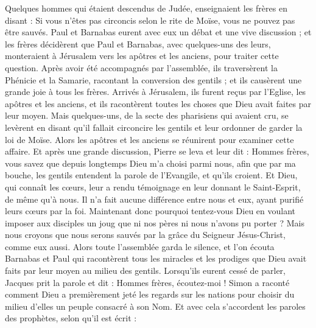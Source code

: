 \begin{multicols}{2}
\VerseOne{}Quelques hommes qui étaient descendus de Judée, enseignaient les frères en disant : Si vous n'êtes pas circoncis selon le rite de Moïse, vous ne pouvez pas être sauvés.
Paul et Barnabas eurent avec eux un débat et une vive discussion ; et les frères décidèrent que Paul et Barnabas, avec quelques-uns des leurs, monteraient à Jérusalem vers les apôtres et les anciens, pour traiter cette question.
Après avoir été accompagnés par l’assemblée, ils traversèrent la Phénicie et la Samarie, racontant la conversion des gentils ; et ils causèrent une grande joie à tous les frères.
Arrivés à Jérusalem, ils furent reçus par l'Eglise, les apôtres et les anciens, et ils racontèrent toutes les choses que Dieu avait faites par leur moyen.
Mais quelques-uns, de la secte des pharisiens qui avaient cru, se levèrent en disant qu'il fallait circoncire les gentils et leur ordonner de garder la loi de Moïse.
Alors les apôtres et les anciens se réunirent pour examiner cette affaire.
Et après une grande discussion, Pierre se leva et leur dit : Hommes frères, vous savez que depuis longtemps Dieu m’a choisi parmi nous, afin que par ma bouche, les gentils entendent la parole de l'Evangile, et qu'ils croient.
Et Dieu, qui connaît les cœurs, leur a rendu témoignage en leur donnant le Saint-Esprit, de même qu'à nous.
Il n'a fait aucune différence entre nous et eux, ayant purifié leurs cœurs par la foi.
Maintenant donc pourquoi tentez-vous Dieu en voulant imposer aux disciples un joug que ni nos pères ni nous n'avons pu porter ?
Mais nous croyons que nous serons sauvés par la grâce du Seigneur Jésus-Christ, comme eux aussi.
Alors toute l'assemblée garda le silence, et l’on écouta Barnabas et Paul qui racontèrent tous les miracles et les prodiges que Dieu avait faits par leur moyen au milieu des gentils.
Lorsqu’ils eurent cessé de parler, Jacques prit la parole et dit : Hommes frères, écoutez-moi !
Simon a raconté comment Dieu a premièrement jeté les regards sur les nations pour choisir du milieu d’elles un peuple consacré à son Nom. 
Et avec cela s'accordent les paroles des prophètes, selon qu'il est écrit :

\end{multicols}
